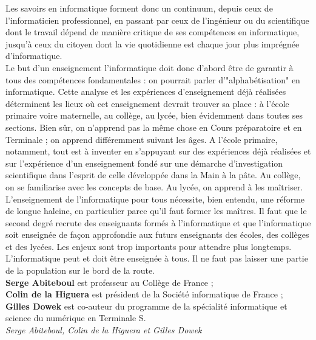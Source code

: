 \documentclass[11pt,twoside,a4paper]{article}
\begin{document}
\begin{multicols}{2}
	Les savoirs en informatique forment donc un continuum, depuis ceux de l'informaticien professionnel, en passant par ceux de l'ing{\'e}nieur ou du scientifique dont le travail d{\'e}pend de mani{\`e}re critique de ses comp{\'e}tences en informatique, jusqu'{\`a} ceux du citoyen dont la vie quotidienne est chaque jour plus impr{\'e}gn{\'e}e d'informatique.~\\
	
	Le but d'un enseignement l'informatique doit donc d'abord {\^e}tre de garantir {\`a} tous des comp{\'e}tences fondamentales : on pourrait parler d'"alphab{\'e}tisation" en informatique. Cette analyse et les exp{\'e}riences d'enseignement d{\'e}j{\`a} r{\'e}alis{\'e}es d{\'e}terminent les lieux o{\`u} cet enseignement devrait trouver sa place : {\`a} l'{\'e}cole primaire voire maternelle, au coll{\`e}ge, au lyc{\'e}e, bien {\'e}videmment dans toutes ses sections. Bien s{\^u}r, on n'apprend pas la m{\^e}me chose en Cours pr{\'e}paratoire et en Terminale ; on apprend diff{\'e}remment suivant les {\^a}ges. A l'{\'e}cole primaire, notamment, tout est {\`a} inventer en s'appuyant sur des exp{\'e}riences d{\'e}j{\`a} r{\'e}alis{\'e}es et sur l'exp{\'e}rience d'un enseignement fond{\'e} sur une d{\'e}marche d'investigation scientifique dans l'esprit de celle d{\'e}velopp{\'e}e dans la Main {\`a} la p{\^a}te. Au coll{\`e}ge, on se familiarise avec les concepts de base. Au lyc{\'e}e, on apprend {\`a} les ma{\^i}triser.~\\
	
	L'enseignement de l'informatique pour tous n{\'e}cessite, bien entendu, une r{\'e}forme de longue haleine, en particulier parce qu'il faut former les ma{\^i}tres. Il faut que le second degr{\'e} recrute des enseignants form{\'e}s {\`a} l'informatique et que l'informatique soit enseign{\'e}e de fa\c{c}on approfondie aux futurs enseignants des {\'e}coles, des coll{\`e}ges et des lyc{\'e}es. Les enjeux sont trop importants pour attendre plus longtemps.~\\
	
	L'informatique peut et doit {\^e}tre enseign{\'e}e {\`a} tous. Il ne faut pas laisser une partie de la population sur le bord de la route.~\\

	\textbf{Serge Abiteboul} est professeur au Coll{\`e}ge de France ;~\\
	
	\textbf{Colin de la Higuera} est pr{\'e}sident de la Soci{\'e}t{\'e} informatique de France ;~\\
	
	\textbf{Gilles Dowek} est co-auteur du programme de la sp{\'e}cialit{\'e} informatique et science du num{\'e}rique en Terminale S.~\\
	
	\emph{Serge Abiteboul, Colin de la Higuera et Gilles Dowek}
\end{multicols}
\end{document}
